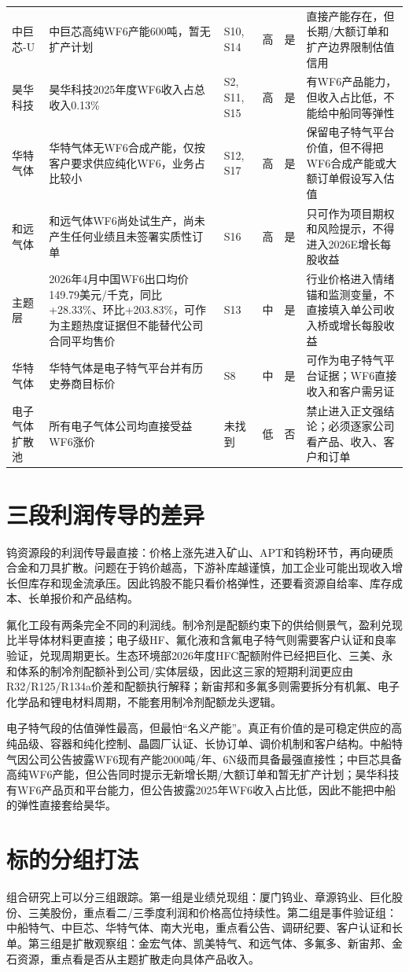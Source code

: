 \begin{exhibitbox}[客户链高影响声明审计]
\begin{tabularx}{\exhibitboxwidth}{L{1.3cm} X L{1.35cm} L{0.85cm} L{0.95cm} X}
中巨芯-U & 中巨芯高纯WF6产能600吨，暂无扩产计划 & S10, S14 & 高 & 是 & 直接产能存在，但长期/大额订单和扩产边界限制估值信用 \\
昊华科技 & 昊华科技2025年度WF6收入占总收入0.13\% & S2, S11, S15 & 高 & 是 & 有WF6产品能力，但收入占比低，不能给中船同等弹性 \\
华特气体 & 华特气体无WF6合成产能，仅按客户要求供应纯化WF6，业务占比较小 & S12, S17 & 高 & 是 & 保留电子特气平台价值，但不得把WF6合成产能或大额订单假设写入估值 \\
和远气体 & 和远气体WF6尚处试生产，尚未产生任何业绩且未签署实质性订单 & S16 & 高 & 是 & 只可作为项目期权和风险提示，不得进入2026E增长每股收益 \\
主题层 & 2026年4月中国WF6出口均价149.79美元/千克，同比+28.33\%、环比+203.83\%，可作为主题热度证据但不能替代公司合同平均售价 & S13 & 中 & 是 & 行业价格进入情绪锚和监测变量，不直接填入单公司收入桥或增长每股收益 \\
华特气体 & 华特气体是电子特气平台并有历史券商目标价 & S8 & 中 & 是 & 可作为电子特气平台证据；WF6直接收入和客户需另证 \\
电子气体扩散池 & 所有电子气体公司均直接受益WF6涨价 & 未找到 & 低 & 否 & 禁止进入正文强结论；必须逐家公司看产品、收入、客户和订单 \\
\bottomrule
\end{tabularx}
\end{exhibitbox}

\section{三段利润传导的差异}
钨资源段的利润传导最直接：价格上涨先进入矿山、APT和钨粉环节，再向硬质合金和刀具扩散。问题在于钨价越高，下游补库越谨慎，加工企业可能出现收入增长但库存和现金流承压。因此钨股不能只看价格弹性，还要看资源自给率、库存成本、长单报价和产品结构。

氟化工段有两条完全不同的利润线。制冷剂是配额约束下的供给侧景气，盈利兑现比半导体材料更直接；电子级HF、氟化液和含氟电子特气则需要客户认证和良率验证，兑现周期更长。生态环境部2026年度HFC配额附件已经把巨化、三美、永和体系的制冷剂配额补到公司/实体层级，因此这三家的短期利润更应由R32/R125/R134a价差和配额执行解释；新宙邦和多氟多则需要拆分有机氟、电子化学品和锂电材料周期，不能套用制冷剂配额龙头逻辑。

电子特气段的估值弹性最高，但最怕“名义产能”。真正有价值的是可稳定供应的高纯品级、容器和纯化控制、晶圆厂认证、长协订单、调价机制和客户结构。中船特气因公司公告披露WF6现有产能2000吨/年、6N级而具备最强直接性；中巨芯具备高纯WF6产能，但公告同时提示无新增长期/大额订单和暂无扩产计划；昊华科技有WF6产品页和平台能力，但公告披露2025年WF6收入占比低，因此不能把中船的弹性直接套给昊华。

\section{标的分组打法}
组合研究上可以分三组跟踪。第一组是业绩兑现组：厦门钨业、章源钨业、巨化股份、三美股份，重点看二/三季度利润和价格高位持续性。第二组是事件验证组：中船特气、中巨芯、华特气体、南大光电，重点看公告、调研纪要、客户认证和长单。第三组是扩散观察组：金宏气体、凯美特气、和远气体、多氟多、新宙邦、金石资源，重点看是否从主题扩散走向具体产品收入。
